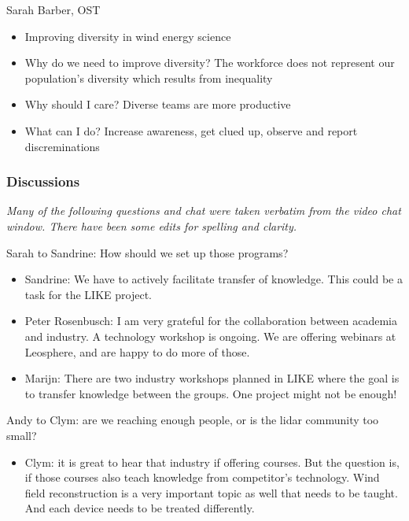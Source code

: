 Sarah Barber, OST

\begin{itemize}
	\item Improving diversity in wind energy science
	\item Why do we need to improve diversity? The workforce does not represent our population's diversity which results from inequality
	\item Why should I care? Diverse teams are more productive
	\item What can I do? Increase awareness, get clued up, observe and report discreminations
\end{itemize}

\subsubsection{Discussions}

\emph{Many of the following questions and chat were taken verbatim from the video chat window. There have been some edits for spelling and clarity.}

Sarah to Sandrine: How should we set up those programs?

\begin{itemize}
	\item Sandrine: We have to actively facilitate transfer of knowledge. This could be a task for the LIKE project.
	\item Peter Rosenbusch: I am very grateful for the collaboration between academia and industry. A technology workshop is ongoing. We are offering webinars at Leosphere, and are happy to do more of those.
	\item Marijn: There are two industry workshops planned in LIKE where the
	      goal is to transfer knowledge between the groups. One project might
	      not be enough!
\end{itemize}

Andy to Clym: are we reaching enough people, or is the lidar community
too small?

\begin{itemize}
	\item Clym: it is great to hear that industry if offering courses. But the
	      question is, if those courses also teach knowledge from competitor's
	      technology. Wind field reconstruction is a very important topic as
	      well that needs to be taught. And each device needs to be treated
	      differently.
\end{itemize}

